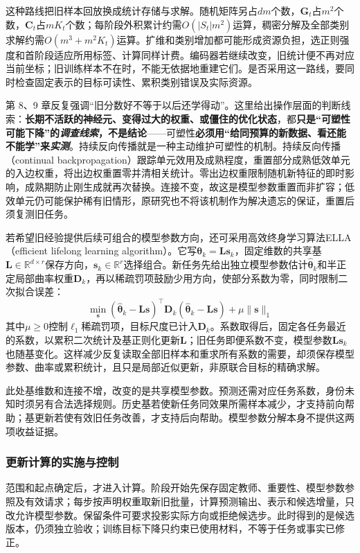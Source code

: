这种路线把旧样本回放换成统计存储与求解。随机矩阵另占$dm$个数，$\bm G_t$占$m^2$个数，$\bm C_t$占$mK_t$个数；每阶段外积累计约需$O(|S_t|m^2)$运算，稠密分解及全部类别求解约需$O(m^3+m^2K_t)$运算。扩维和类别增加都可能形成资源负担，选正则强度和首阶段适应所用标签、计算同样计费。编码器若继续改变，旧统计便不再对应当前坐标；旧训练样本不在时，不能无依据地重建它们。是否采用这一路线，要同时检查固定表示的目标可读性、累积类别错误及实际资源。

第 8、9 章反复强调“旧分数好不等于以后还学得动”。这里给出操作层面的判断线索：\textbf{长期不活跃的神经元、变得过大的权重、或僵住的优化状态}，都\textbf{只是“可塑性可能下降”的\emph{调查线索}，不是结论}——可塑性\textbf{必须用“给同预算的新数据、看还能不能学”来\emph{实测}}。持续反向传播就是一种主动维护可塑性的机制。持续反向传播（continual backpropagation）跟踪单元效用及成熟程度，重置部分成熟低效单元的入边权重，将出边权重置零并清相关统计。零出边权重限制随机新特征的即时影响，成熟期防止刚生成就再次替换。连接不变，故这是模型参数重置而非扩容；低效单元仍可能保护稀有旧情形，原研究也不将该机制作为解决遗忘的保证，重置后须复测旧任务。

若希望旧经验提供后续可组合的模型参数方向，还可采用高效终身学习算法ELLA（efficient lifelong learning algorithm）。它写$\bm\theta_k=\bm L\bm s_k$，固定维数的共享基$\bm L\in\mathbb R^{d\times r}$保存方向，$\bm s_k\in\mathbb R^r$选择组合。新任务先给出独立模型参数估计$\hat{\bm\theta}_k$和半正定局部曲率权重$\bm D_k$，再以稀疏罚项鼓励少用方向，使部分系数为零，同时限制二次拟合误差：
\[
\min_{\bm s}
(\hat{\bm\theta}_k-\bm L\bm s)^\top
\bm D_k(\hat{\bm\theta}_k-\bm L\bm s)+\mu\lVert\bm s\rVert_1
\]
其中$\mu\geq0$控制$\ell_1$稀疏罚项，目标尺度已计入$\bm D_k$。系数取得后，固定各任务最近的系数，以累积二次统计及基正则化更新$\bm L$；旧任务即便系数不变，模型参数$\bm L\bm s_k$也随基变化。这样减少反复读取全部旧样本和重求所有系数的需要，却须保存模型参数、曲率或累积统计，且只是局部近似更新，非原联合目标的精确求解。

此处基维数和连接不增，改变的是共享模型参数。预测还需对应任务系数，身份未知时须另有合法选择规则。历史基若使新任务同效果所需样本减少，才支持前向帮助；基更新若使有效旧任务改善，才支持后向帮助。模型参数分解本身不提供这两项收益证据。

\subsubsection{更新计算的实施与控制}
\label{sec:ket-update-computation}

范围和起点确定后，才进入计算。阶段开始先保存固定教师、重要性、模型参数参照及有效请求；每步按声明权重取新旧批量，计算预测输出、表示和候选增量，只改允许模型参数。保留条件可要求投影实际方向或拒绝候选步。此时得到的是候选版本，仍须独立验收；训练目标下降只约束已使用材料，不等于任务或事实已修正。

